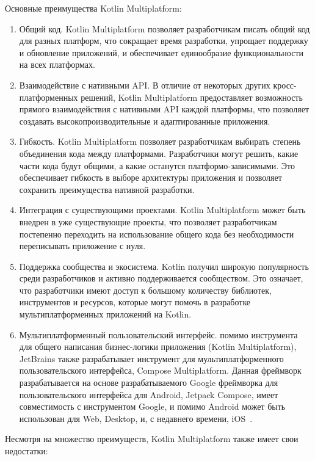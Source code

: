 \documentclass[14pt, russian]{scrartcl}
\begin{document}
Основные преимущества Kotlin Multiplatform:

\begin{enumerate}
    \item Общий код. Kotlin Multiplatform позволяет разработчикам писать общий код для разных платформ, что сокращает время разработки, упрощает поддержку и обновление приложений, и обеспечивает единообразие функциональности на всех платформах.
    \item Взаимодействие с нативными API. В отличие от некоторых других кросс-платформенных решений, Kotlin Multiplatform предоставляет возможность прямого взаимодействия с нативными API каждой платформы, что позволяет создавать высокопроизводительные и адаптированные приложения.
    \item Гибкость. Kotlin Multiplatform позволяет разработчикам выбирать степень объединения кода между платформами. Разработчики могут решить, какие части кода будут общими, а какие останутся платформо-зависимыми. Это обеспечивает гибкость в выборе архитектуры приложения и позволяет сохранить преимущества нативной разработки.
    \item Интеграция с существующими проектами. Kotlin Multiplatform может быть внедрен в уже существующие проекты, что позволяет разработчикам постепенно переходить на использование общего кода без необходимости переписывать приложение с нуля.
    \item Поддержка сообщества и экосистема. Kotlin получил широкую популярность среди разработчиков и активно поддерживается сообществом. Это означает, что разработчики имеют доступ к большому количеству библиотек, инструментов и ресурсов, которые могут помочь в разработке мультиплатформенных приложений на Kotlin.
    \item Мультиплатформенный пользовательский интерфейс. помимо инструмента для общего написания бизнес-логики приложения (Kotlin Multiplatform), JetBrains также разрабатывает инструмент для мультиплатформенного пользовательского интерфейса, Compose Multiplatform. Данная фреймворк разрабатывается на основе разрабатываемого Google фреймворка для пользовательского интерфейса для Android, Jetpack Compose, имеет совместимость с инструментом Google, и помимо Android может быть использован для Web, Desktop, и, с недавнего времени, iOS~\cite{ComposeMPiOS}.
\end{enumerate}

Несмотря на множество преимуществ, Kotlin Multiplatform также имеет свои недостатки:
\end{document}
